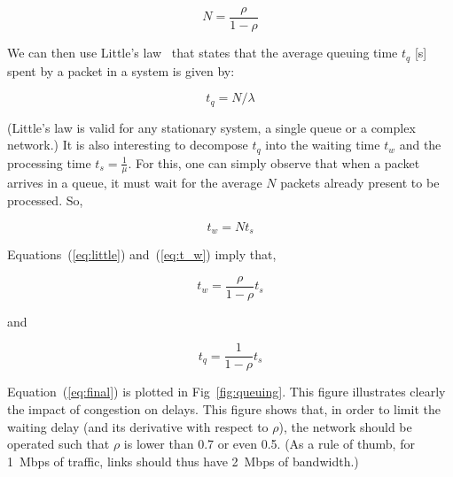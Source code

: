\begin{equation}
N = \frac{\rho}{1-\rho}
\end{equation}

We can then use Little's law~\cite{littleLaw} that states that the average queuing time \(t_q\) [s] spent by a packet in a system is given by:

\begin{equation}
\label{eq:little}
t_q = N/\lambda
\end{equation}

(Little's law is valid for any stationary system, \eg a single queue or a complex network.) It is also interesting to decompose \(t_q\) into the waiting time \(t_w\) and the processing time \(t_s = \frac{1}{\mu}\). For this, one can simply observe that when a packet arrives in a queue, it must wait for the average \(N\) packets already present to be processed. So,

\begin{equation}
\label{eq:t_w}
t_w = N t_s
\end{equation}

Equations~(\ref{eq:little}) and~(\ref{eq:t_w}) imply that,

\begin{equation}
t_w = \frac{\rho}{1-\rho} t_s
\end{equation}

\noindent and

\begin{equation}
\label{eq:final}
t_q = \frac{1}{1-\rho} t_s
\end{equation}

Equation~(\ref{eq:final}) is plotted in Fig~\ref{fig:queuing}. This figure illustrates clearly the impact of congestion on delays. This figure shows that, in order to limit the waiting delay (and its derivative with respect to \(\rho\)), the network should be operated such that \(\rho\) is lower than 0.7 or even 0.5. (As a rule of thumb, for 1~Mbps of traffic, links should thus have 2~Mbps of bandwidth.)

